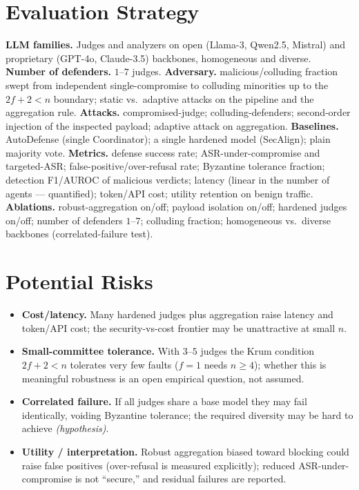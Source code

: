 \documentclass[11pt]{article}
\newcommand{\hyp}{\textit{(hypothesis)}\xspace}
\begin{document}
\section*{Evaluation Strategy}
\textbf{LLM families.} Judges and analyzers on open (Llama-3, Qwen2.5, Mistral) and proprietary (GPT-4o, Claude-3.5) backbones, homogeneous and diverse. \textbf{Number of defenders.} $1$--$7$ judges. \textbf{Adversary.} malicious/colluding fraction swept from independent single-compromise to colluding minorities up to the $2f+2<n$ boundary; static vs.\ adaptive attacks on the pipeline and the aggregation rule. \textbf{Attacks.} compromised-judge; colluding-defenders; second-order injection of the inspected payload; adaptive attack on aggregation. \textbf{Baselines.} AutoDefense (single Coordinator); a single hardened model (SecAlign); plain majority vote. \textbf{Metrics.} defense success rate; ASR-under-compromise and targeted-ASR; false-positive/over-refusal rate; Byzantine tolerance fraction; detection F1/AUROC of malicious verdicts; latency (linear in the number of agents --- quantified); token/API cost; utility retention on benign traffic. \textbf{Ablations.} robust-aggregation on/off; payload isolation on/off; hardened judges on/off; number of defenders $1$--$7$; colluding fraction; homogeneous vs.\ diverse backbones (correlated-failure test).

\section*{Potential Risks}
\begin{itemize}
  \item \textbf{Cost/latency.} Many hardened judges plus aggregation raise latency and token/API cost; the security-vs-cost frontier may be unattractive at small $n$.
  \item \textbf{Small-committee tolerance.} With $3$--$5$ judges the Krum condition $2f+2<n$ tolerates very few faults ($f=1$ needs $n\ge4$); whether this is meaningful robustness is an open empirical question, not assumed.
  \item \textbf{Correlated failure.} If all judges share a base model they may fail identically, voiding Byzantine tolerance; the required diversity may be hard to achieve \hyp.
  \item \textbf{Utility / interpretation.} Robust aggregation biased toward blocking could raise false positives (over-refusal is measured explicitly); reduced ASR-under-compromise is not ``secure,'' and residual failures are reported.
\end{itemize}
\end{document}
